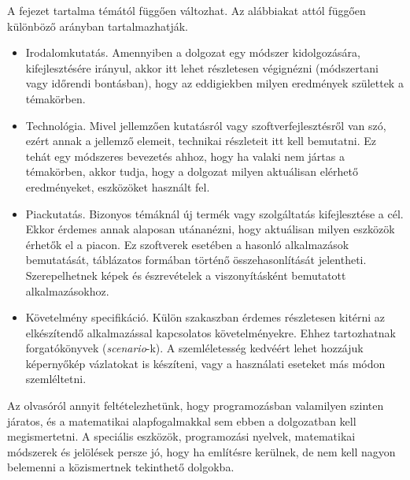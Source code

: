 A fejezet tartalma témától függően változhat. Az alábbiakat attól függően különböző arányban tartalmazhatják.
\begin{itemize}
\item Irodalomkutatás. Amennyiben a dolgozat egy módszer kidolgozására, kifejlesztésére irányul, akkor itt lehet részletesen végignézni (módszertani vagy időrendi bontásban), hogy az eddigiekben milyen eredmények születtek a témakörben.
\item Technológia. Mivel jellemzően kutatásról vagy szoftverfejlesztésről van szó, ezért annak a jellemző elemeit, technikai részleteit itt kell bemutatni.
Ez tehát egy módszeres bevezetés ahhoz, hogy ha valaki nem jártas a témakörben, akkor tudja, hogy a dolgozat milyen aktuálisan elérhető eredményeket, eszközöket használt fel.
\item Piackutatás. Bizonyos témáknál új termék vagy szolgáltatás kifejlesztése a cél.
Ekkor érdemes annak alaposan utánanézni, hogy aktuálisan milyen eszközök érhetők el a piacon.
Ez szoftverek esetében a hasonló alkalmazások bemutatását, táblázatos formában történő összehasonlítását jelentheti.
Szerepelhetnek képek és észrevételek a viszonyításként bemutatott alkalmazásokhoz.
\item Követelmény specifikáció. Külön szakaszban érdemes részletesen kitérni az elkészítendő alkalmazással kapcsolatos követelményekre.
Ehhez tartozhatnak forgatókönyvek (\textit{scenario}-k).
A szemléletesség kedvéért lehet hozzájuk képernyőkép vázlatokat is készíteni, vagy a használati eseteket más módon szemléltetni.
\end{itemize}


Az olvasóról annyit feltételezhetünk, hogy programozásban valamilyen szinten járatos, és a matematikai alapfogalmakkal sem ebben a dolgozatban kell megismertetni.
A speciális eszközök, programozási nyelvek, matematikai módszerek és jelölések persze jó, hogy ha említésre kerülnek, de nem kell nagyon belemenni a közismertnek tekinthető dolgokba.